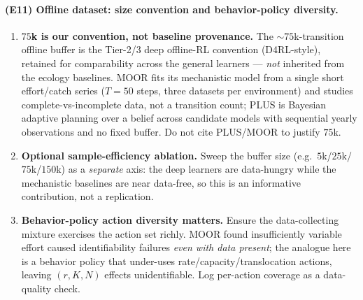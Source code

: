 \documentclass[11pt]{article}
\begin{document}
\paragraph{(E11) Offline dataset: size convention and behavior-policy diversity.}
\begin{enumerate}[leftmargin=1.8em,nosep]
\item \textbf{$75$k is our convention, not baseline provenance.} The
$\sim\!75$k-transition offline buffer is the Tier-2/3 deep offline-RL convention
(D4RL-style), retained for comparability across the general learners --- \emph{not}
inherited from the ecology baselines. MOOR \cite{moor2025} fits its mechanistic model
from a single short effort/catch series ($T{=}50$ steps, three datasets per
environment) and studies complete-vs-incomplete data, not a transition count; PLUS
\cite{plus2018} is Bayesian adaptive planning over a belief across candidate models
with sequential yearly observations and no fixed buffer. Do not cite PLUS/MOOR to
justify $75$k.
\item \textbf{Optional sample-efficiency ablation.} Sweep the buffer size (e.g.\
$5$k/$25$k/$75$k/$150$k) as a \emph{separate} axis: the deep learners are data-hungry
while the mechanistic baselines are near data-free, so this is an informative
contribution, not a replication.
\item \textbf{Behavior-policy action diversity matters.} Ensure the data-collecting
mixture exercises the action set richly. MOOR found insufficiently variable effort
caused identifiability failures \emph{even with data present}; the analogue here is a
behavior policy that under-uses rate/capacity/translocation actions, leaving $(r,K,N)$
effects unidentifiable. Log per-action coverage as a data-quality check.
\end{enumerate}
\end{document}
